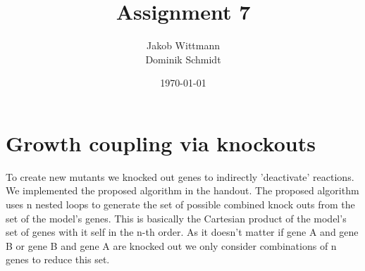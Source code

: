 \documentclass{scrartcl}
\title{Assignment 7}
\author{Jakob Wittmann\\Dominik Schmidt}
\date{\today}
\begin{document}
\maketitle
\section{Growth coupling via knockouts}
   To create new mutants we knocked out genes to indirectly 'deactivate' reactions. We implemented the proposed algorithm in the handout.
   The proposed algorithm uses n nested loops to generate the set of possible combined knock outs from the set of the model's genes. This
   is basically the Cartesian product of the model's set of genes with it self in the n-th order. As it doesn't matter if gene A and gene B
   or gene B and gene A are knocked out we only consider combinations of n genes to reduce this set.
   
\end{document}
